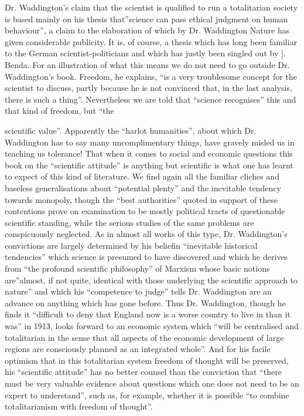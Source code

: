 \documentclass[11pt,openany]{book}
\begin{document}
Dr. Waddington's claim that the scientist is qualified to run a totalitarian society is based mainly on his thesis that''science can pass ethical judgment on human behaviour'', a claim to the elaboration of which by Dr. Waddington Nature has given considerable publicity. It is, of course, a thesis which has long been familiar to the German scientist-politicians and which has justly been singled out by ]. Benda. For an illustration of what this means we do not need to go outside Dr. Waddington's book. Freedom, he explains, ``is a very troublesome concept for the scientist to discuss, partly because he is not convinced that, in the last analysis, there is such a thing''. Nevertheless we are told that ``science recognises'' this and that kind of freedom, but ``the

scientific value''. Apparently the ``harlot humanities'', about which Dr. Waddington has to say many uncomplimentary things, have gravely misled us in teaching us tolerance! That when it comes to social and economic questions this book on the ``scientific attitude'' is anything but scientific is what one has learnt to expect of this kind of literature. We find again all the familiar cliches and baseless generalisations about ``potential plenty'' and the inevitable tendency towards monopoly, though the ``best authorities'' quoted in support of these contentions prove on examination to be mostly political tracts of questionable scientific standing, while the serious studies of the same problems are conspicuously neglected. As in almost all works of this type, Dr. Waddington's convictions are largely determined by his beliefin ``inevitable historical tendencies'' which science is presumed to have discovered and which he derives from ``the profound scientific philosophy'' of Marxism whose basic notions are''almost, if not quite, identical with those underlying the scientific approach to nature'' and which his ``competence to judge'' tells Dr. Waddington are an advance on anything which has gone before. Thus Dr. Waddington, though he finds it ``difficult to deny that England now is a worse country to live in than it was'' in 1913, looks forward to an economic system which ``will be centralised and totalitarian in the sense that all aspects of the economic development of large regions are consciously planned as an integrated whole''. And for his facile optimism that in this totalitarian system freedom of thought will be preserved, his ``scientific attitude'' has no better counsel than the conviction that ``there must be very valuable evidence about questions which one does not need to be an expert to understand'', such as, for example, whether it is possible ``to combine totalitarianism with freedom of thought''.
\end{document}

